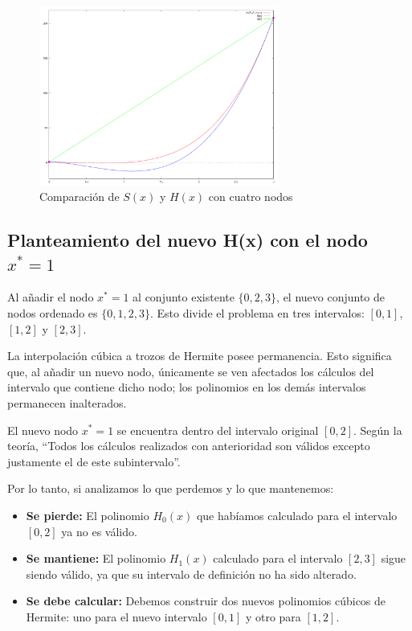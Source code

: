 \documentclass{article}
\begin{document}
\newpage

\begin{figure}[hb]
    \centering
    \includegraphics[width=0.7\textwidth]{src/comparacubicas2.png}
    \caption{Comparación de $S(x)$ y $H(x)$ con cuatro nodos}
    \label{fig:cuatro_nodos}
\end{figure}

\newpage

\subsection{Planteamiento del nuevo H(x) con el nodo $x^*=1$}

Al añadir el nodo $x^*=1$ al conjunto existente $\{0, 2, 3\}$, el nuevo conjunto de nodos ordenado es $\{0, 1, 2, 3\}$. Esto divide el problema en tres intervalos: $[0,1]$, $[1,2]$ y $[2,3]$.

La interpolación cúbica a trozos de Hermite posee permanencia. Esto significa que, al añadir un nuevo nodo, únicamente se ven afectados los cálculos del intervalo que contiene dicho nodo; los polinomios en los demás intervalos permanecen inalterados.

El nuevo nodo $x^*=1$ se encuentra dentro del intervalo original $[0,2]$. Según la teoría, ``Todos los cálculos realizados con anterioridad son válidos excepto justamente el de este subintervalo''.

Por lo tanto, si analizamos lo que perdemos y lo que mantenemos:
\begin{itemize}
    \item \textbf{Se pierde:} El polinomio $H_0(x)$ que habíamos calculado para el intervalo $[0,2]$ ya no es válido.
    \item \textbf{Se mantiene:} El polinomio $H_1(x)$ calculado para el intervalo $[2,3]$ sigue siendo válido, ya que su intervalo de definición no ha sido alterado.
    \item \textbf{Se debe calcular:} Debemos construir dos nuevos polinomios cúbicos de Hermite: uno para el nuevo intervalo $[0,1]$ y otro para $[1,2]$.
\end{itemize}
\end{document}
